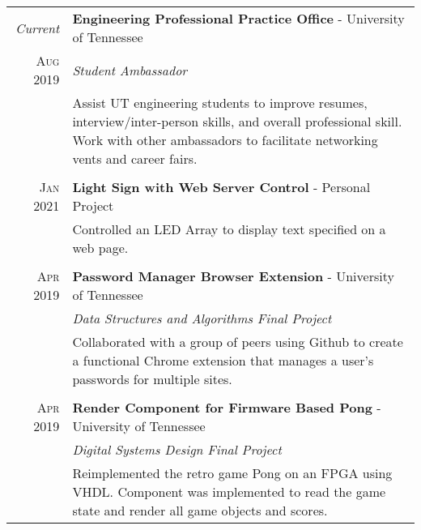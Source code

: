 \documentclass[a4paper,11pt]{article}
\begin{document}
\begin{tabularx}{\textwidth}{r|X}

   \emph{Current} & \textbf{Engineering Professional Practice Office} \-- University of Tennessee\\
   \textsc{Aug 2019} & \emph{Student Ambassador}\\
   & \small{Assist UT engineering students to improve resumes, interview/inter-person skills, and overall professional skill.
            Work with other ambassadors to facilitate networking vents and career fairs.
   } \\

   \multicolumn{2}{c}{} \\

   \textsc{Jan 2021} & \textbf{Light Sign with Web Server Control} \-- Personal Project\\
   & \small{Controlled an LED Array to display text specified on a web page.}\\

   \multicolumn{2}{c}{} \\

   \textsc{Apr 2019} & \textbf{Password Manager Browser Extension} \-- University of Tennessee\\
   & \emph{Data Structures and Algorithms Final Project}\\
   & \small{Collaborated with a group of peers using Github to create a functional Chrome extension that manages a user's passwords for multiple sites.}\\

   \multicolumn{2}{c}{} \\

   \textsc{Apr 2019} & \textbf{Render Component for Firmware Based Pong} \-- University of Tennessee\\
   & \emph{Digital Systems Design Final Project}\\
   & \small{Reimplemented the retro game Pong on an FPGA using VHDL\@.
            Component was implemented to read the game state and render all game objects and scores.
            }\\
\end{tabularx}
\end{document}
